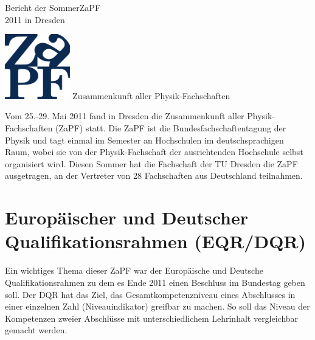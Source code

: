 \documentclass{scrartcl}
\begin{document}
% 

\begin{minipage}{0.7\textwidth}
 \Huge{Bericht der SommerZaPF\\ 2011 in Dresden} 
\end{minipage}
\hfill
\begin{minipage}{120pt}
\vspace{-1cm}
\includegraphics[width=80pt]{logo.pdf}
\centering
\small Zusammenkunft aller Physik-Fachschaften
\end{minipage}
\vspace{7ex}

Vom 25.-29. Mai 2011 fand in Dresden die Zusammenkunft aller Physik-Fachschaften (ZaPF) statt. Die ZaPF ist die
Bundesfachschaftentagung der Physik und tagt einmal im Semester an Hochschulen im deutschsprachigen Raum, wobei sie von
der Physik-Fachschaft der ausrichtenden Hochschule selbst organisiert wird. Diesen Sommer hat die Fachschaft der TU
Dresden die ZaPF ausgetragen, an der Vertreter von 28 Fachschaften aus Deutschland teilnahmen.


\section*{Europäischer und Deutscher Qualifikationsrahmen (EQR/DQR)}
\vspace{-12pt}
Ein wichtiges Thema dieser ZaPF war der Europäische und Deutsche Qualifikationsrahmen zu dem es Ende 2011 einen
Beschluss im Bundestag geben soll. Der DQR hat das Ziel, das Gesamtkompetenzniveau eines Abschlusses in einer
einzelnen Zahl (Niveauindikator) greifbar zu machen. So soll das Niveau der Kompetenzen zweier Abschlüsse
mit unterschiedlichem Lehrinhalt vergleichbar gemacht werden.
\end{document}
